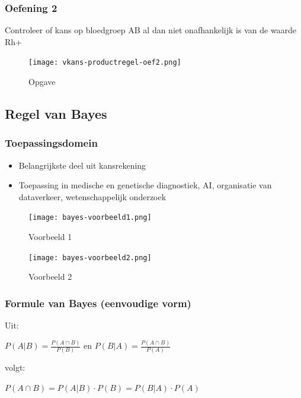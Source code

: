 \documentclass{article}
\begin{document}
\subsubsection{Oefening 2}

Controleer of kans op bloedgroep AB al dan niet onafhankelijk is van de waarde Rh+

\begin{figure}[H]
    \centering
    \texttt{[image: vkans-productregel-oef2.png]}
    \caption{Opgave}
\end{figure}

\subsection{Regel van Bayes}

\subsubsection{Toepassingsdomein}

\begin{itemize}
    \item Belangrijkste deel uit kansrekening
    \item Toepassing in medische en genetische diagnostiek, AI, organisatie van dataverkeer, wetenschappelijk onderzoek
\end{itemize}

\begin{figure}[H]
    \centering
    \texttt{[image: bayes-voorbeeld1.png]}
    \caption{Voorbeeld 1}
\end{figure}

\begin{figure}[H]
    \centering
    \texttt{[image: bayes-voorbeeld2.png]}
    \caption{Voorbeeld 2}
\end{figure}

\subsubsection{Formule van Bayes (eenvoudige vorm)}

Uit:

\begin{center}
    $P(A | B) = \frac{P(A \cap B)}{P(B)}$ en $P(B | A) = \frac{P(A \cap B)}{P(A)}$
\end{center}

volgt:

\begin{center}
    $P(A \cap B) = P(A | B) \cdot P(B) = P(B | A) \cdot P(A)$
\end{center}
\end{document}
